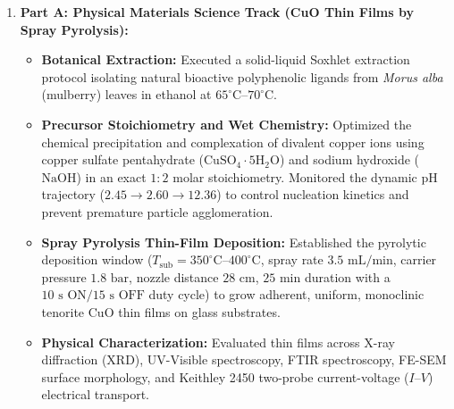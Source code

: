 \documentclass[12pt,a4paper,oneside]{report}
\begin{document}
{{{\begin{enumerate}
    \item \textbf{Part A: Physical Materials Science Track (CuO Thin Films by Spray Pyrolysis):}
    \begin{itemize}
        \item \textbf{Botanical Extraction:} Executed a solid-liquid Soxhlet extraction protocol isolating natural bioactive polyphenolic ligands from \textit{Morus alba} (mulberry) leaves in ethanol at $65^\circ\text{C}\text{--}70^\circ\text{C}$.
        \item \textbf{Precursor Stoichiometry and Wet Chemistry:} Optimized the chemical precipitation and complexation of divalent copper ions using copper sulfate pentahydrate ($\text{CuSO}_4\cdot 5\text{H}_2\text{O}$) and sodium hydroxide ($\text{NaOH}$) in an exact $1:2$ molar stoichiometry. Monitored the dynamic pH trajectory ($2.45 \rightarrow 2.60 \rightarrow 12.36$) to control nucleation kinetics and prevent premature particle agglomeration.
        \item \textbf{Spray Pyrolysis Thin-Film Deposition:} Established the pyrolytic deposition window ($T_{\text{sub}} = 350^\circ\text{C}\text{--}400^\circ\text{C}$, spray rate $3.5\text{ mL/min}$, carrier pressure $1.8\text{ bar}$, nozzle distance $28\text{ cm}$, $25\text{ min}$ duration with a $10\text{ s ON} / 15\text{ s OFF}$ duty cycle) to grow adherent, uniform, monoclinic tenorite $\text{CuO}$ thin films on glass substrates.
        \item \textbf{Physical Characterization:} Evaluated thin films across X-ray diffraction (XRD), UV-Visible spectroscopy, FTIR spectroscopy, FE-SEM surface morphology, and Keithley 2450 two-probe current-voltage ($I\text{--}V$) electrical transport.
    \end{itemize}


\end{enumerate}}}}
\end{document}
